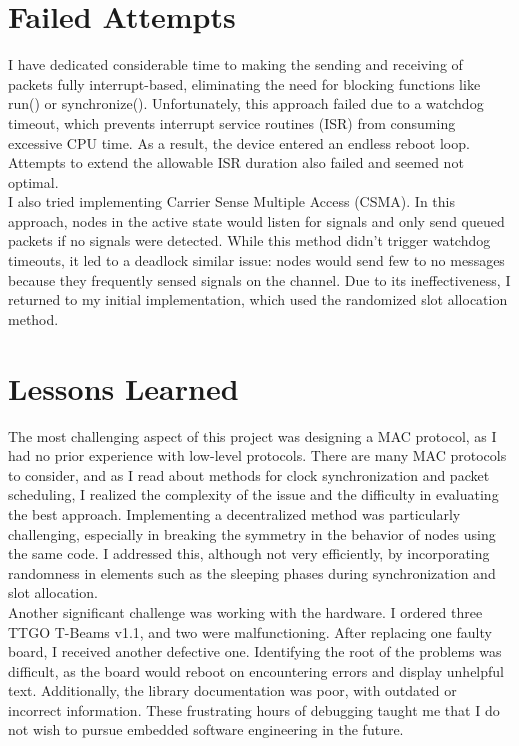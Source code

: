 \section*{Failed Attempts}


I have dedicated considerable time to making the sending and receiving of packets fully interrupt-based, eliminating the need for blocking functions like run() or synchronize(). Unfortunately, this approach failed due to a watchdog timeout, which prevents interrupt service routines (ISR) from consuming excessive CPU time. As a result, the device entered an endless reboot loop. Attempts to extend the allowable ISR duration also failed and seemed not optimal. \\

I also tried implementing Carrier Sense Multiple Access (CSMA). In this approach, nodes in the active state would listen for signals and only send queued packets if no signals were detected. While this method didn't trigger watchdog timeouts, it led to a deadlock similar issue: nodes would send few to no messages because they frequently sensed signals on the channel. Due to its ineffectiveness, I returned to my initial implementation, which used the randomized slot allocation method. \\

\section*{Lessons Learned}

The most challenging aspect of this project was designing a MAC protocol, as I had no prior experience with low-level protocols. There are many MAC protocols to consider, and as I read about methods for clock synchronization and packet scheduling, I realized the complexity of the issue and the difficulty in evaluating the best approach. Implementing a decentralized method was particularly challenging, especially in breaking the symmetry in the behavior of nodes using the same code. I addressed this, although not very efficiently, by incorporating randomness in elements such as the sleeping phases during synchronization and slot allocation.\\

Another significant challenge was working with the hardware. I ordered three TTGO T-Beams v1.1, and two were malfunctioning. After replacing one faulty board, I received another defective one. Identifying the root of the problems was difficult, as the board would reboot on encountering errors and display unhelpful text. Additionally, the library documentation was poor, with outdated or incorrect information. These frustrating hours of debugging taught me that I do not wish to pursue embedded software engineering in the future.
